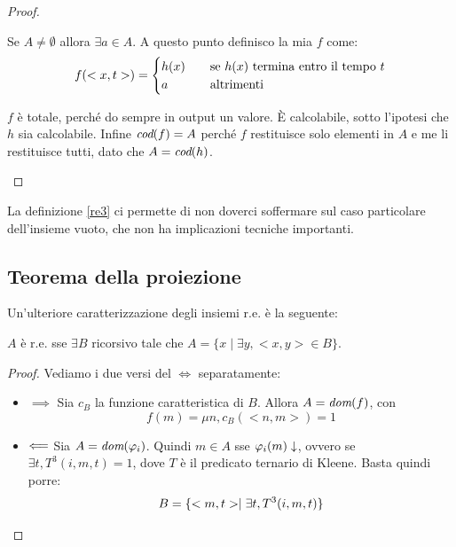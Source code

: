\begin{proof}
\begin{itemize}
        Se $A \not= \emptyset$ allora $\exists a \in A$. A questo punto definisco la mia $f$ come:
        \begin{equation*}
            f(<x,t>) = 
            \begin{cases}
                h(x) \quad &\text{se $h(x)$ termina entro il tempo $t$}\\
                a \quad &\text{altrimenti}
            \end{cases}
        \end{equation*}

        $f$ è totale, perché do sempre in output un valore. È calcolabile, sotto l'ipotesi che $h$
        sia calcolabile. Infine $\textit{cod}(f) = A$ perché $f$ restituisce solo elementi in $A$ e me li
        restituisce tutti, dato che $A = \textit{cod}(h)$.
    \end{itemize}
\end{proof}


La definizione \eqref{re3} ci permette di non doverci soffermare sul caso particolare dell'insieme
vuoto, che non ha implicazioni tecniche importanti.

\subsection{Teorema della proiezione}

Un'ulteriore caratterizzazione degli insiemi r.e. è la seguente:

\begin{thm}
    $A$ è r.e. sse $\exists B$ ricorsivo tale che $A = \{x \mid \exists y, <x,y> \in B\}$.
\end{thm}
\begin{proof}
    Vediamo i due versi del $\iff$ separatamente:
    \begin{itemize}
        \item $\implies$ Sia $c_{B}$ la funzione caratteristica di $B$. Allora $A = \textit{dom}(f)$, con
        \begin{equation*}
            f(m) = \mu n, c_{B}(<n,m>) = 1
        \end{equation*}
        \item $\Longleftarrow$ Sia $A = \textit{dom}(\varphi_{i})$. Quindi $m \in A$ sse $\varphi_{i}(m) \downarrow$, ovvero
        se $\exists t, T^{3}(i,m,t) = 1$, dove $T$ è il predicato ternario di Kleene.
        Basta quindi porre:
        \begin{equation*}
            B = \{<m,t> \mid \exists t, T^{3}(i,m,t)\}
        \end{equation*}
    \end{itemize}
\end{proof}

